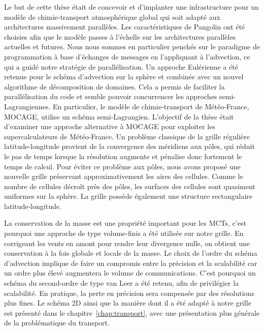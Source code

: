 Le but de cette thèse était de concevoir et d'implanter une infrastructure
pour un modèle de chimie-transport atmosphérique global qui soit adapté aux
architectures massivement parallèles. Les caractéristiques de Pangolin ont été
choisies afin que le modèle passes à l'échelle sur les architectures parallèles
actuelles et futures. Nous nous sommes en particulier penchés sur le paradigme
de programmation à base d'échanges de messages en l'appliquant à l'advection,
ce qui a guidé notre stratégie de parallélisation. Un approche Eulérienne a été
retenue pour le schéma d'advection sur la sphère et combinée avec un nouvel
algorithme de décomposition de domaines. Cela a permis de faciliter la
parallélisation du code et semble pouvoir concurrencer les approches
semi-Lagrangiennes. En particulier, le modèle de chimie-transport de
Météo-France, MOCAGE, utilise un schéma semi-Lagrangien. L'objectif de la thèse
était d'examiner une approche alternative à MOCAGE pour exploiter les
supercalculateurs de Météo-France. Un problème classique de la grille régulière
latitude-longitude provient de la convergence des méridiens aux p\^oles, qui réduit
le pas de temps lorsque la résolution augmente et pénalise donc fortement le
temps de calcul. Pour éviter ce problème aux p\^oles, nous avons proposé une
nouvelle grille préservant approximativement les aires des cellules. Comme le nombre
de cellules décroît près des p\^oles, les surfaces des cellules sont quasiment
uniformes sur la sphère. La grille possède également une structure rectangulaire
latitude-longitude.

La conservation de la masse est une propriété important pour les MCTs, c'est
pourquoi une approche de type volume-finis a été utilisée sur notre grille. En
corrigeant les vents en amont pour rendre leur divergence nulle, on obtient
une conservation à la fois globale et locale de la masse. Le choix de l'ordre du
schéma d'advection implique de faire un compromis entre la précision et la
scalabilité car un ordre plus élevé augmentera le volume de communications.
C'est pourquoi un schéma du second-ordre de type van Leer a été retenu, afin de
privilégier la scalabilité. En pratique, la perte en précision sera compensée
par des résolutions plus fines. Le schéma 2D ainsi que la manière dont il a été
adapté à notre grille est présenté dans le chapitre~\ref{chap:transport}, avec
une présentation plus générale de la problématique du transport.

